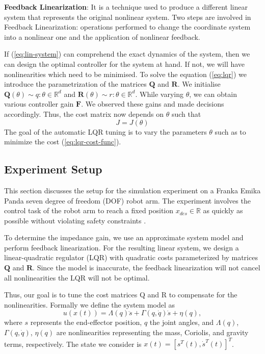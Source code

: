 \textbf{Feedback Linearization}: It is a technique used to produce a different linear system that represents the original nonlinear system. Two steps are involved in Feedback Linearization: operations performed to change the coordinate system into a nonlinear one and the application of nonlinear feedback.

If (\ref{eq:lin-system}) can comprehend the exact dynamics of the system, then we can design the optimal controller for the system at hand. If not, we will have nonlinearities which need to be minimised. To solve the equation (\ref{eq:lqr}) we introduce the parametrization of the matrices $\boldsymbol{Q}$ and $\boldsymbol{R}$. We initialise $\boldsymbol{Q}(\theta) \sim q : \theta \in \mathbb{R}^d$ and $\boldsymbol{R}(\theta) \sim r : \theta \in \mathbb{R}^d$.
While varying $\theta$, we can obtain various controller gain $\boldsymbol{F}$. We observed these gains and made decisions accordingly. Thus, the cost matrix now depends on $\theta$ such that
\begin{equation}
J=J(\theta)
\end{equation}
The goal of the automatic LQR tuning is to vary the parameters $\theta$ such as to minimize the cost (\ref{eq:lqr-cost-func}).

\subsection{Experiment Setup}
\label{subsec:exp-setup}
This section discusses the setup for the simulation experiment on a Franka Emika Panda seven degree of freedom (DOF) robot arm. The experiment involves the control task of the robot arm to reach a fixed position $x_{des} \in \mathbb{R}$ as quickly as possible without violating safety constraints \cite{gosafeopt}.

To determine the impedance gain, we use an approximate system model and perform feedback linearization. For the resulting linear system, we design a linear-quadratic regulator (LQR) with quadratic costs parameterized by matrices $\boldsymbol{Q}$ and $\boldsymbol{R}$. Since the model is inaccurate, the feedback linearization will not cancel all nonlinearities the LQR will not be optimal. 

Thus, our goal is to tune the cost matrices Q and R to compensate for the nonlinearities. Formally we define the system model as
\begin{equation}\label{eq:modellqr}
u(x(t)) = \Lambda(q) \ddot{s} + \Gamma(q,\dot{q})\dot{s} + \eta(q),
\end{equation}
where $s$ represents the end-effector position, $q$ the joint angles, and $\Lambda(q)$,
$\Gamma(q,\dot{q})$, $\eta(q)$ are nonlinearities representing the mass, Coriolis, and gravity terms, respectively. The state we consider is $x(t)=[s^T(t), \dot{s}^T(t)]^T$.


